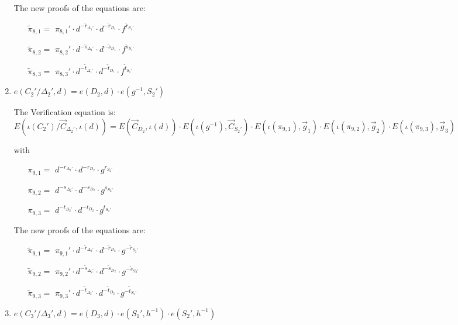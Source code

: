 \begin{description}
\begin{enumerate}
    The new proofs of the equations are:
    
    \begin{itemize}
    \item[$\tilde{\pi}_{8,1} = $] $\pi_{8,1}' \cdot d^{-\tilde{r}_{\Delta_1'}} \cdot d^{-\tilde{r}_{D_1}} \cdot f^{\tilde{r}_{S_1'}}$
    \item[$\tilde{\pi}_{8,2} = $] $\pi_{8,2}' \cdot d^{-\tilde{s}_{\Delta_1'}} \cdot d^{-\tilde{s}_{D_1}} \cdot f^{\tilde{s}_{S_1'}}$
    \item[$\tilde{\pi}_{8,3} = $] $\pi_{8,3}' \cdot d^{-\tilde{t}_{\Delta_1'}} \cdot d^{-\tilde{t}_{D_1}} \cdot f^{\tilde{t}_{S_1'}}$
    \end{itemize}

    
  \item $e(C_2'/\boxed{\Delta_2'}, d) = e (\boxed{D_2},d) \cdot e(g^{-1}, \boxed{S_2'})$

    The Verification equation is: $ E(\iota(C_2')/\vec{C}_{\Delta_2'}, \iota(d)) = E(\vec{C}_{D_2},\iota(d)) \cdot E(\iota(g^{-1}), \vec{C}_{S_2'})\cdot E(\iota(\pi_{9,1}), \vec{g}_1)\cdot E(\iota(\pi_{9,2}), \vec{g}_2)\cdot E(\iota(\pi_{9,3}), \vec{g}_3)$

    with
    \begin{itemize}
    \item[$\pi_{9,1} = $] $d^{-r_{\Delta_2'}} \cdot d^{-r_{D_2}} \cdot g^{r_{S_2'}}$
    \item[$\pi_{9,2} = $] $d^{-s_{\Delta_2'}} \cdot d^{-s_{D_2}} \cdot g^{s_{S_2'}}$
    \item[$\pi_{9,3} = $] $d^{-t_{\Delta_2'}} \cdot d^{-t_{D_2}} \cdot g^{t_{S_2'}}$
    \end{itemize}

    The new proofs of the equations are:
    
    \begin{itemize}
    \item[$\tilde{\pi}_{9,1} = $] $\pi_{9,1}' \cdot d^{-\tilde{r}_{\Delta_2'}} \cdot d^{-\tilde{r}_{D_2}} \cdot g^{-\tilde{r}_{S_2'}}$
    \item[$\tilde{\pi}_{9,2} = $] $\pi_{9,2}' \cdot d^{-\tilde{s}_{\Delta_2'}} \cdot d^{-\tilde{s}_{D_2}} \cdot g^{-\tilde{s}_{S_2'}}$
    \item[$\tilde{\pi}_{9,3} = $] $\pi_{9,3}' \cdot d^{-\tilde{t}_{\Delta_2'}} \cdot d^{-\tilde{t}_{D_2}} \cdot g^{-\tilde{t}_{S_2'}}$
    \end{itemize}

  \item $e(C_3'/\boxed{\Delta_3'}, d) = e (\boxed{D_3},d) \cdot e(\boxed{S_1'}, h^{-1}) \cdot e(\boxed{S_2'}, h^{-1})$


\end{enumerate}
\end{description}
